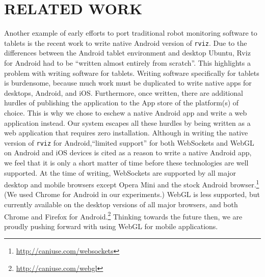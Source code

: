 \documentclass[letterpaper, 10 pt, conference]{ieee/ieeeconf}  %
\begin{document}

\cite{lofaro2013unified}

\section{RELATED WORK}

Another example of early efforts to port traditional robot monitoring software to tablets is the recent work to write native Android version of \texttt{rviz}.
Due to the differences between the Android tablet environment and desktop Ubuntu, Rviz for Android had to be ``written almost entirely from scratch''. \cite{rviz_android}
This highlights a problem with writing software for tablets.
Writing software specifically for tablets is burdensome, because much work must be duplicated to write native apps for desktops, Android, and iOS.
Furthermore, once written, there are additional hurdles of publishing the application to the App store of the platform(s) of choice.
This is why we chose to eschew a native Android app and write a web application instead.
Our system escapes all these hurdles by being written as a web application that requires zero installation.
Although in writing the native version of \texttt{rviz} for Android,``limited support'' for both WebSockets and WebGL on Android and iOS devices is cited as a reason to write a native Android app, we feel that it is only a short matter of time before these technologies are well supported.
At the time of writing, WebSockets are supported by all major desktop and mobile browsers except Opera Mini and the stock Android browser.\footnote{\url{http://caniuse.com/websockets}}
(We used Chrome for Android in our experiments.)
WebGL is less supported, but currently available on the desktop versions of all major browsers, and both Chrome and Firefox for Android.\footnote{\url{http://caniuse.com/webgl}}
Thinking towards the future then, we are proudly pushing forward with using WebGL for mobile applications.
\end{document}
